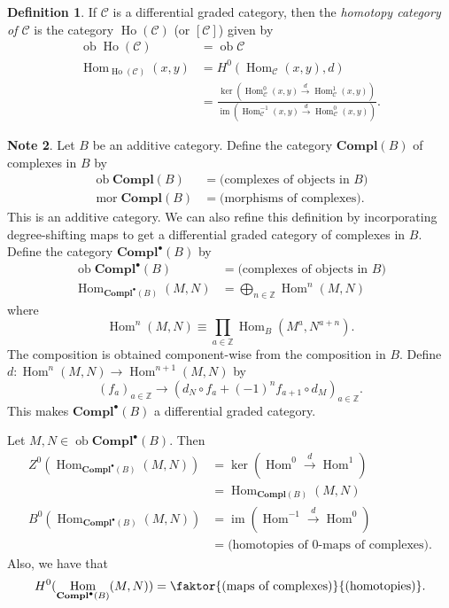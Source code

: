 \documentclass[10pt,letterpaper,cm]{nupset}
\theoremstyle{definition}
\newtheorem{definition}{Definition}[subsection]
\newtheorem{note}[definition]{Note}
\theoremstyle{theorem}
\theoremstyle{remark}
\newcommand{\Z}{\mathbb Z}
\newcommand{\1}{\mathbf{1}}
\renewcommand{\c}{\mathscr{C}}
\newcommand{\0}{\vec 0}
\DeclareMathOperator{\im}{im}
\DeclareMathOperator{\mor}{mor}
\DeclareMathOperator{\ob}{ob}
\DeclareMathOperator{\Hom}{Hom}
\DeclareMathOperator{\ho}{Ho}
\begin{document}
\begin{definition}
If $\c$ is a differential graded category, then the \textit{homotopy category of $\c$} is the category $\ho(\c)$ (or $[\c]$) given by 
\begin{align*}
\ob{\ho(\c)} & = \ob{\c}
\\  \Hom_{\ho(\c)}(x,y) & = H^0(\Hom_{\c}(x,y), d)
\\ & =\frac{   \ker(\Hom^0_{\c}(x,y) \overset{d}{\longrightarrow} \Hom_{\c}^1(x,y))  }{  \im(\Hom_{\c}^{-1}(x,y) \overset{d}{\longrightarrow} \Hom_{\c}^0(x,y))      }.
\end{align*}
\end{definition}

\begin{note} Let $B$ be an additive category. Define the category  $\mathbf{Compl}(B)$  of complexes in $B$ by 
\begin{align*}
\ob{\mathbf{Compl}(B)} & = \text{(complexes of objects in } B\text{)}
\\ \mor{\mathbf{Compl}(B)} & = \text{(morphisms of complexes)}.
\end{align*}
This is an additive category. We can also refine this definition by incorporating degree-shifting maps to get a differential graded category of complexes in $B$. Define the category $\mathbf{Compl}^{\bullet}(B)$ by 
\begin{align*}
\ob{\mathbf{Compl}^{\bullet}(B)} & = \text{(complexes of objects in } B\text{)}
\\ \Hom_{\mathbf{Compl}^{\bullet}(B)}(M, N) & = \bigoplus_{n \in \Z}\Hom^n(M, N)
\end{align*}
where $$ \Hom^n(M , N) \equiv \prod_{a\in \Z} \Hom_B(M^a, N^{a+n})  .$$  The composition is obtained component-wise from the composition in $B$. Define $d : \Hom^n(M, N) \to \Hom^{n+1}(M, N)$ by $$ (f_a)_{a\in \Z} \to (d_N \circ f_a + ({-}1)^n f_{a+1} \circ d_M)_{a\in \Z}  .$$ This makes $\mathbf{Compl}^{\bullet}(B)$ a differential graded category. 

\medskip


Let $M , N \in \ob{\mathbf{Compl}^{\bullet}(B)}$. Then 
\begin{align*}
Z^0(\Hom_{\mathbf{Compl}^{\bullet}(B)}(M, N)) & =\ker(\Hom^0 \overset{d}{\longrightarrow} \Hom^1) 
\\
 & = \Hom_{\mathbf{Compl}(B)}(M, N) 
 \\ B^0(\Hom_{\mathbf{Compl}^{\bullet}(B)}(M, N)) & = \im(\Hom^{-1} \overset{d}{\longrightarrow} \Hom^0) 
 \\ & = \text{(homotopies of }0\text{-maps of complexes)}.
 \end{align*} Also, we have that $$H^0(\Hom_{\mathbf{Compl}^{\bullet}(B)}(M, N))=  \faktor{\text{(maps of complexes)}}{\text{(homotopies)}}.$$
 \end{note}
\end{document}
